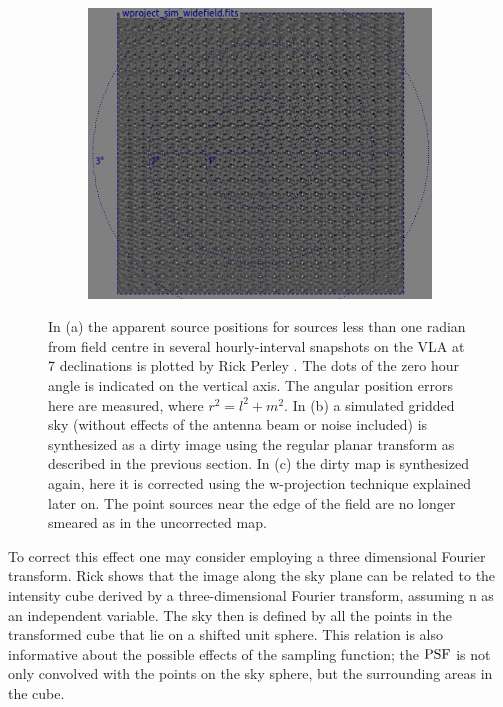 \begin{figure}[ht!]
\begin{mdframed}
\begin{subfigure}[b]{0.49\textwidth}
      \caption{}
    \end{subfigure}
    \begin{subfigure}[b]{0.49\textwidth}
      \centering
      \includegraphics[width=\textwidth]{images/widefield_corrected_meerkat.png}
      \caption{}
    \end{subfigure}
    \caption[Apparent shift in source position and resulting decorrelation]{In (a) the apparent source positions for sources less than one radian from field centre in 
    several hourly-interval snapshots on the VLA at 7 declinations is plotted by Rick Perley \cite[Lecture 19]{taylor1999synthesis}. The dots of the zero hour angle is indicated on the vertical 
    axis. The angular position errors here are measured, where $r^2=l^2+m^2$. In (b) a simulated gridded sky (without effects of the antenna beam or noise included) is 
    synthesized as a dirty image using the regular planar transform as described in the previous section. In (c) the dirty map is synthesized again, here it is 
    corrected using the w-projection technique explained later on. The point sources near the edge of the field are no longer smeared as in the uncorrected map.}
    \label{fig_position_shifts_and_decorrelation}
  \end{mdframed}
\end{figure}

To correct this effect one may consider employing a three dimensional Fourier transform. Rick \cite[Lecture 19]{taylor1999synthesis} shows that the 
image along the sky plane can be related to the intensity cube derived by a three-dimensional Fourier transform, assuming n as an independent variable. 
The sky then is defined by all the points in the transformed cube that lie on a shifted unit sphere. This relation is also informative about the possible 
effects of the sampling function; the $\textrm{PSF}$ is not only convolved with the points on the sky sphere, but the surrounding areas in the cube.


